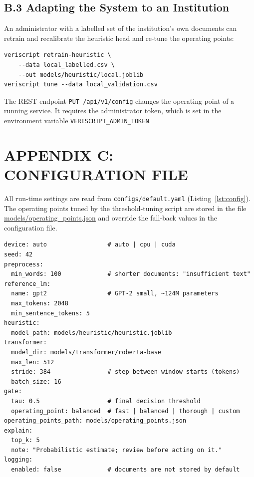 \section*{B.3 Adapting the System to an Institution}

An administrator with a labelled set of the institution's own documents can
retrain and recalibrate the heuristic head and re-tune the operating points:

\begin{lstlisting}[language={},numbers=none,caption={Retraining and re-tuning on local data},label={lst:adapt}]
veriscript retrain-heuristic \
    --data local_labelled.csv \
    --out models/heuristic/local.joblib
veriscript tune --data local_validation.csv
\end{lstlisting}

The REST endpoint \texttt{PUT /api/v1/config} changes the operating point of a
running service. It requires the administrator token, which is set in the
environment variable \texttt{VERISCRIPT\_ADMIN\_TOKEN}.

\clearpage
\chapter*{APPENDIX C: CONFIGURATION FILE}
\phantomsection
{}

All run-time settings are read from \texttt{configs/default.yaml}
(Listing~\ref{lst:config}). The operating points tuned by the threshold-tuning
script are stored in the file \url{models/operating_points.json} and override
the fall-back values in the configuration file.

\begin{lstlisting}[language={},numbers=none,caption={Default configuration (\texttt{configs/default.yaml})},label={lst:config}]
device: auto                 # auto | cpu | cuda
seed: 42
preprocess:
  min_words: 100             # shorter documents: "insufficient text"
reference_lm:
  name: gpt2                 # GPT-2 small, ~124M parameters
  max_tokens: 2048
  min_sentence_tokens: 5
heuristic:
  model_path: models/heuristic/heuristic.joblib
transformer:
  model_dir: models/transformer/roberta-base
  max_len: 512
  stride: 384                # step between window starts (tokens)
  batch_size: 16
gate:
  tau: 0.5                   # final decision threshold
  operating_point: balanced  # fast | balanced | thorough | custom
operating_points_path: models/operating_points.json
explain:
  top_k: 5
  note: "Probabilistic estimate; review before acting on it."
logging:
  enabled: false             # documents are not stored by default
\end{lstlisting}
